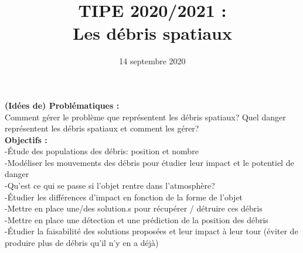 \documentclass[a4paper,1pt]{article}
\title{TIPE 2020/2021 : \\ Les débris spatiaux}
\date{14 septembre 2020}
\begin{document}
\maketitle
\textbf{ (Idées de) Problématiques :}
\\
Comment gérer le problème que représentent les débris spatiaux?
Quel danger représentent les débris spatiaux et comment les gérer? 
\\

\textbf{Objectifs :}
\\
-Étude des populations des débris: position et nombre
\\
-Modéliser les mouvements des débris pour étudier leur impact et le potentiel de danger
\\
-Qu'est ce qui se passe si l'objet rentre dans l'atmosphère?
\\
-Étudier les différences d'impact en fonction de la forme de l'objet
\\
-Mettre en place une/des solution.s pour récupérer / détruire ces débris
\\
-Mettre en place une détection et une prédiction de la position des débris
\\
-Étudier la faisabilité des solutions proposées et leur impact à leur tour (éviter de produire plus de débris qu'il n'y en a déjà)
\end{document}
